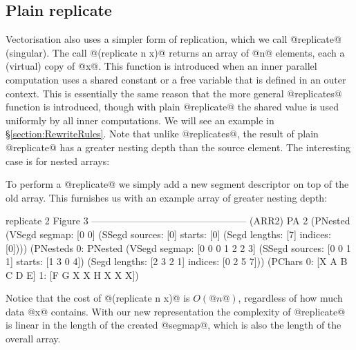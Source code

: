 \subsection{Plain replicate}
\label{section:PlainReplicate}
\noindent
Vectorisation also uses a simpler form of replication, which we call @replicate@ (singular). The call @(replicate n x)@ returns an array of @n@ elements, each a (virtual) copy of @x@. This function is introduced when an inner parallel computation uses a shared constant or a free variable that is defined in an outer context. This is essentially the same reason that the more general @replicates@ function is introduced, though with plain @replicate@ the shared value is used uniformly by all inner computations. We will see an example in \S\ref{section:RewriteRules}. Note that unlike @replicates@, the result of plain @replicate@ has a greater nesting depth than the source element. The interesting case is for nested arrays:
%
\begin{small}
\end{small}
%
\noindent
To perform a @replicate@ we simply add a new segment descriptor on top of the old array. This furnishes us with an example array of greater nesting depth:
%
\begin{small}
\begin{code}
  replicate 2 {Figure 3}
 ------------------------------------------------ (ARR2)
  PA 2 (PNested
   (VSegd  segmap: [0 0] 
   (SSegd sources: [0]  starts: [0]
   (Segd  lengths: [7] indices: [0])))
   (PNesteds 
    0: PNested
       (VSegd  segmap: [0 0 0 1 2 2 3]
       (SSegd sources: [0 0 1 1]  starts: [1 3 0 4])
       (Segd  lengths: [2 3 2 1] indices: [0 2 5 7]))
       (PChars 0: [X A B C D E]
               1: [F G X X H X X X])
\end{code}
\end{small}

Notice that the cost of @(replicate n x)@ is $O(@n@)$, regardless of how much data @x@ contains. With our new representation the complexity of @replicate@ is linear in the length of the created @segmap@, which is also the length of the overall array. 


